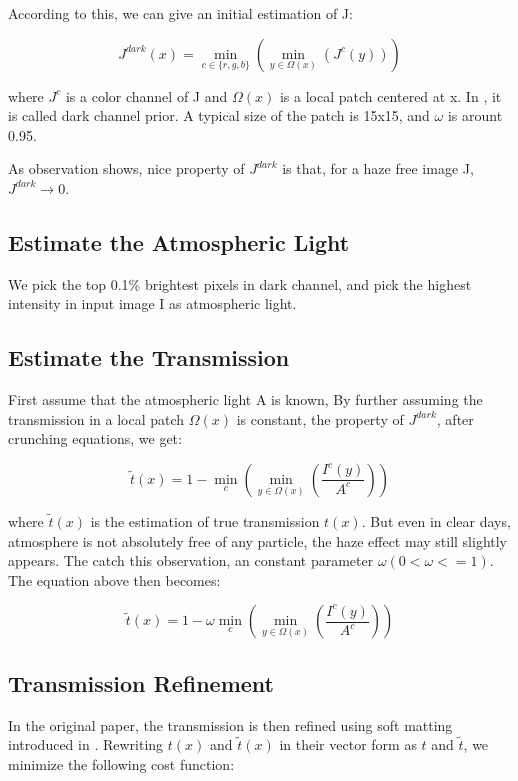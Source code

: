 \documentclass{article}
\begin{document}
        According to this, we can give an initial estimation of J:

        $$J^{dark}(x) = \min_{c\in\{r, g, b\}} (\min_{y \in \Omega(x)} (J^{c}(y)))$$

        where $J^{c}$ is a color channel of J and $\Omega(x)$ is a local patch centered at x. In \cite{Kaiming}, it is called dark channel prior. A typical size of the patch is 15x15, and $\omega$ is arount 0.95.

        As observation shows, nice property of $J^{dark}$ is that, for a haze free image J, $J^{dark} \to 0$.

    \subsection{Estimate the Atmospheric Light}

        We pick the top 0.1\% brightest pixels in dark channel, and pick the highest intensity in input image I as atmospheric light.

    \subsection{Estimate the Transmission}

        First assume that the atmospheric light A is known, By further assuming the transmission in a local patch $\Omega(x)$ is constant, the property of $J^{dark}$, after crunching equations, we get:

        $$\widetilde{t}(x) = 1 - \min_{c} (\min_{y \in \Omega(x)} (\frac{I^{c}(y)}{A^{c}}))$$

        where $\widetilde{t}(x)$ is the estimation of true transmission $t(x)$. But even in clear days, atmosphere is not absolutely free of any particle, the haze effect may still slightly appears. The catch this observation, an constant parameter $\omega(0 < \omega <= 1)$. The equation above then becomes:

        $$\widetilde{t}(x) = 1 - \omega \min_{c} (\min_{y \in \Omega(x)} (\frac{I^{c}(y)}{A^{c}}))$$


    \subsection{Transmission Refinement}

        In the original paper, the transmission is then refined using soft matting introduced in \cite{Anat}.  Rewriting $t(x)$ and $\widetilde{t}(x)$ in their vector form as $t$ and $\widetilde{t}$, we minimize the following cost function:
\end{document}
